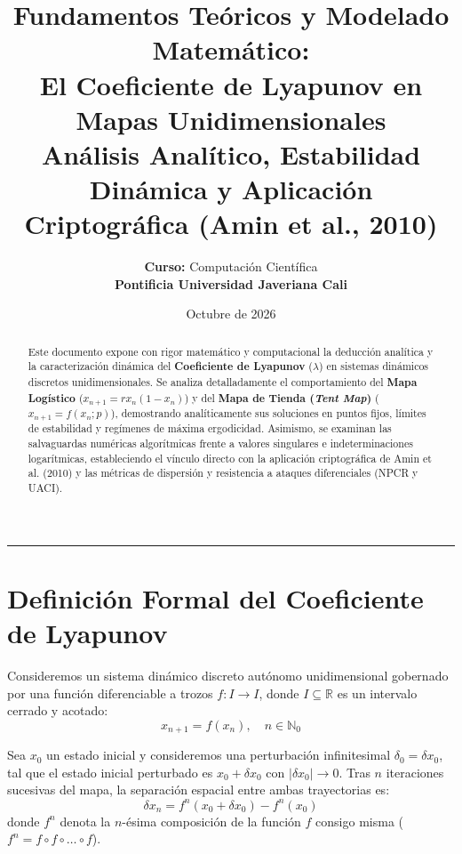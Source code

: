\documentclass[11pt,letterpaper]{article}
\title{\vspace{-1.5cm}\textbf{\Large Fundamentos Teóricos y Modelado Matemático:}\\
\textbf{\LARGE El Coeficiente de Lyapunov en Mapas Unidimensionales}\\[0.3cm]
\large Análisis Analítico, Estabilidad Dinámica y Aplicación Criptográfica (Amin et al., 2010)}
\author{\textbf{Curso:} Computación Científica \\
\textbf{Pontificia Universidad Javeriana Cali}}
\date{Octubre de 2026}
\theoremstyle{definition}
\begin{document}
\maketitle
\thispagestyle{fancy}

\begin{abstract}
Este documento expone con rigor matemático y computacional la deducción analítica y la caracterización dinámica del \textbf{Coeficiente de Lyapunov} ($\lambda$) en sistemas dinámicos discretos unidimensionales. Se analiza detalladamente el comportamiento del \textbf{Mapa Logístico} ($x_{n+1} = r x_n (1 - x_n)$) y del \textbf{Mapa de Tienda (\textit{Tent Map})} ($x_{n+1} = f(x_n; p)$), demostrando analíticamente sus soluciones en puntos fijos, límites de estabilidad y regímenes de máxima ergodicidad. Asimismo, se examinan las salvaguardas numéricas algorítmicas frente a valores singulares e indeterminaciones logarítmicas, estableciendo el vínculo directo con la aplicación criptográfica de Amin et al. (2010) y las métricas de dispersión y resistencia a ataques diferenciales (NPCR y UACI).
\end{abstract}

\vspace{0.3cm}
\tableofcontents
\vspace{0.5cm}
\hrule
\vspace{0.5cm}

\section{Definición Formal del Coeficiente de Lyapunov}

Consideremos un sistema dinámico discreto autónomo unidimensional gobernado por una función diferenciable a trozos $f: I \to I$, donde $I \subseteq \mathbb{R}$ es un intervalo cerrado y acotado:
\begin{equation}
    x_{n+1} = f(x_n), \quad n \in \mathbb{N}_0
    \label{eq:sistema_discreto}
\end{equation}

Sea $x_0$ un estado inicial y consideremos una perturbación infinitesimal $\delta_0 = \delta x_0$, tal que el estado inicial perturbado es $x_0 + \delta x_0$ con $|\delta x_0| \to 0$. Tras $n$ iteraciones sucesivas del mapa, la separación espacial entre ambas trayectorias es:
\begin{equation}
    \delta x_n = f^n(x_0 + \delta x_0) - f^n(x_0)
\end{equation}
donde $f^n$ denota la $n$-ésima composición de la función $f$ consigo misma ($f^n = f \circ f \circ \dots \circ f$).
\end{document}
